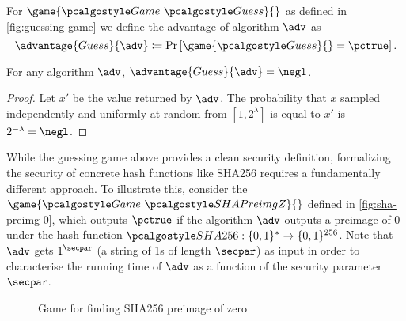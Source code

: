 \begin{definition}
  For $\game{\Game~\algo{Guess}}{}$ as defined in \autoref{fig:guessing-game} we define the advantage of algorithm $\adv$ as
 \[
  \advantage{Guess}{\adv} \defeq \pr{\game{\algo{Guess}}{} = \pctrue}.
 \]
\end{definition}

\begin{proposition}\label{prop:guessing-game}
  For any algorithm $\adv$, $\advantage{Guess}{\adv} = \negl$.
\end{proposition}

\begin{proof}
Let $x'$ be the value returned by $\adv$.
The probability that $x$ sampled independently and uniformly at random from $[1, 2^\lambda]$ is equal to $x'$ is $2^{-\lambda} = \negl$.
\end{proof}

While the guessing game above provides a clean security definition, formalizing the security of concrete hash functions like SHA256 requires a fundamentally different approach.
To illustrate this, consider the $\game{\Game~\algo{SHAPreimgZ}}{}$ defined in \autoref{fig:sha-preimg-0}, which outputs $\pctrue$ if the algorithm $\adv$ outputs a preimage of 0 under the hash function $\algo{SHA256}: \{0, 1\}^* \rightarrow \{0, 1\}^{256}$.
Note that $\adv$ gets $1^{\secpar}$ (a string of 1s of length $\secpar$) as input in order to characterise the running time of $\adv$ as a function of the security parameter $\secpar$.


\begin{figure}[tbhp]
  \begin{center}
    \begin{tcolorbox}[width=5cm]
      \begin{pchstack}[center]
      \end{pchstack}
    \end{tcolorbox}
  \end{center}
  \caption{Game for finding SHA256 preimage of zero \label{fig:sha-preimg-0}}
\end{figure}

